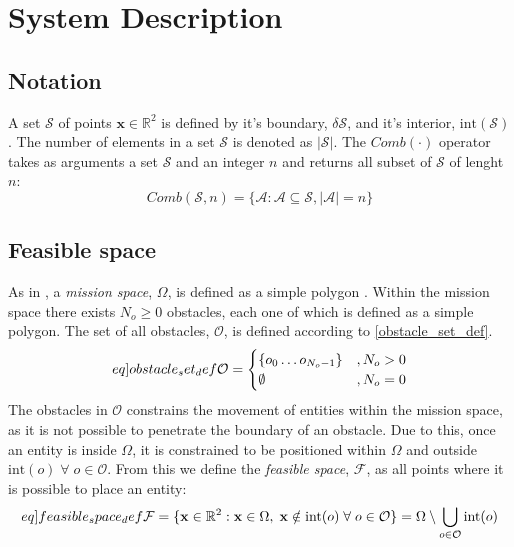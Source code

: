 \section{System Description}

\subsection{Notation}
A set $\mathcal{S}$ of points $\mathbf{x}\in\mathbb{R}^{2}$ is defined by it's boundary, $\delta\mathcal{S}$, 
and it's interior, $\mathrm{int}(\mathcal{S})$. The number of elements in a set $\mathcal{S}$ is denoted as $|\mathcal{S}|$.\newline
The $Comb(\cdot)$ operator takes as arguments a set $\mathcal{S}$ and an integer $n$ and returns all subset of $\mathcal{S}$ of lenght $n$:
\begin{equation}
  Comb(\mathcal{S}, n) = \{\mathcal{A}: \mathcal{A}\subseteq\mathcal{S}, |\mathcal{A}|=n\}
\end{equation}

\subsection{Feasible space}
As in \cite{sun2014escaping}, a \textit{mission space}, $\Omega$, is defined as a simple polygon 
\cite{weissteinsimplepolygon}.
Within the mission space there exists $N_{o}\geq 0$ obstacles, each one of which is defined as a simple polygon.
The set of all obstacles, $\mathcal{O}$, is defined according to \eqref{obstacle_set_def}.
\begin{equation}\label[eq]{obstacle_set_def}
  \mathcal{O} = \begin{cases}
    \{o_{0}\hdots o_{N_{o}-1}\} &, N_{o} > 0\\
    \emptyset &, N_{o} = 0\\
  \end{cases}
\end{equation}
The obstacles in $\mathcal{O}$ constrains the movement of entities within the mission space, as it is not possible to
penetrate the boundary of an obstacle. Due to this, once an entity is inside $\Omega$, it is constrained to be positioned within
$\Omega$ and outside $\mathrm{int}(o)\;\forall\;o\in\mathcal{O}$. From this we define the \textit{feasible space}, $\mathcal{F}$, as
all points where it is possible to place an entity:
\begin{equation}\label[eq]{feasible_space_def}
  \mathcal{F} = \{\mathbf{x}\in\mathbb{R}^{2}: \mathbf{x}\in\Omega,\;\mathbf{x}\notin\mathrm{int}(o)\;\forall\;o\in\mathcal{O}\} = \Omega\setminus\bigcup_{o\in\mathcal{O}}\mathrm{int}(o)
\end{equation}

